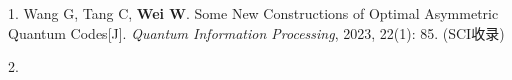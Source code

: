 \begin{publications}{99}

\item[1.]
Wang G, Tang C, \textbf{Wei W}. Some New Constructions of Optimal Asymmetric Quantum Codes[J]. \textit{Quantum Information Processing}, 2023, 22(1): 85. (SCI收录)

\item[2.]



\end{publications}
